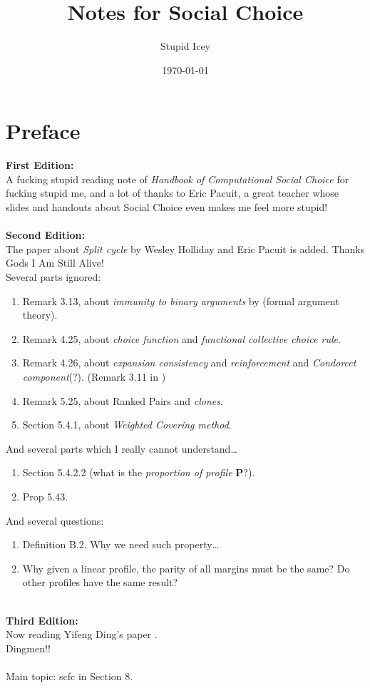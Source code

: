 \documentclass[a4paper,12pt,oneside]{book}
\title{Notes for Social Choice}
\author{Stupid Icey}
\date{\today}
\newcommand{\profile}{\mathbf{P}}
\begin{document}
\maketitle


\chapter*{Preface}
\textbf{First Edition:}\\
A fucking stupid reading note of \textit{Handbook of Computational Social Choice} \parencite{Moulin2016} for fucking stupid me, and a lot of thanks to Eric Pacuit, a great teacher whose slides and handouts about Social Choice even makes me feel more stupid!\\
~\\
\noindent \textbf{Second Edition:}\\
The paper about \emph{Split cycle} by Wesley Holliday and Eric Pacuit \parencite{Holliday2020} is added. Thanks Gods I Am Still Alive!\\
Several parts ignored:
\begin{enumerate}
  \item Remark 3.13, about \emph{immunity to binary arguments} by \textcite{Heitzig2002} (formal argument theory).
  \item Remark 4.25, about \emph{choice function} and \emph{functional collective choice rule}.
  \item Remark 4.26, about \emph{expansion consistency} and \emph{reinforcement} and \emph{Condorcet component}(?). (Remark 3.11 in \textcite{Ding2023})
  \item Remark 5.25, about Ranked Pairs and \emph{clones}.
  \item Section 5.4.1, about \emph{Weighted Covering method}.
\end{enumerate}

\noindent And several parts which I really cannot understand\dots
\begin{enumerate}
  \item Section 5.4.2.2 (what is the \emph{proportion of profile} $\profile$?).
  \item Prop 5.43.
\end{enumerate}

\noindent And several questions:
\begin{enumerate}
  \item Definition B.2. Why we need such property\dots
  \item Why given a linear profile, the parity of all margins must be the same? Do other profiles have the same result?
\end{enumerate}
~\\
\noindent \textbf{Third Edition:}\\
Now reading Yifeng Ding's paper \parencite{Ding2023}.\\
Dingmen!!\\
~\\
Main topic: scfc in Section 8.
\end{document}
